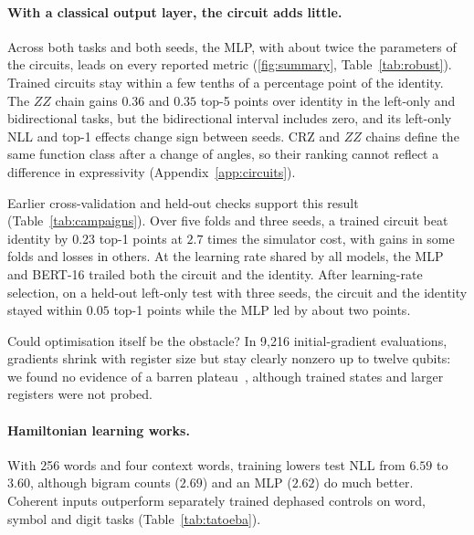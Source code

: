 \documentclass[11pt,a4paper]{article}
\begin{document}
\paragraph{With a classical output layer, the circuit adds little.}
Across both tasks and both seeds, the MLP, with about twice the parameters of the circuits, leads on every reported metric (\cref{fig:summary}, Table~\ref{tab:robust}). Trained circuits stay within a few tenths of a percentage point of the identity. The $ZZ$ chain gains $0.36$ and $0.35$ top-5 points over identity in the left-only and bidirectional tasks, but the bidirectional interval includes zero, and its left-only NLL and top-1 effects change sign between seeds. CRZ and $ZZ$ chains define the same function class after a change of angles, so their ranking cannot reflect a difference in expressivity (Appendix~\ref{app:circuits}).

Earlier cross-validation and held-out checks support this result (Table~\ref{tab:campaigns}). Over five folds and three seeds, a trained circuit beat identity by $0.23$ top-1 points at $2.7$ times the simulator cost, with gains in some folds and losses in others. At the learning rate shared by all models, the MLP and BERT-16 trailed both the circuit and the identity. After learning-rate selection, on a held-out left-only test with three seeds, the circuit and the identity stayed within $0.05$ top-1 points while the MLP led by about two points.

Could optimisation itself be the obstacle? In 9,216 initial-gradient evaluations, gradients shrink with register size but stay clearly nonzero up to twelve qubits: we found no evidence of a barren plateau~\cite{mcclean2018,cerezo2021}, although trained states and larger registers were not probed.

\paragraph{Hamiltonian learning works.}
With 256 words and four context words, training lowers test NLL from $6.59$ to $3.60$, although bigram counts ($2.69$) and an MLP ($2.62$) do much better. Coherent inputs outperform separately trained dephased controls on word, symbol and digit tasks (Table~\ref{tab:tatoeba}).
\end{document}
